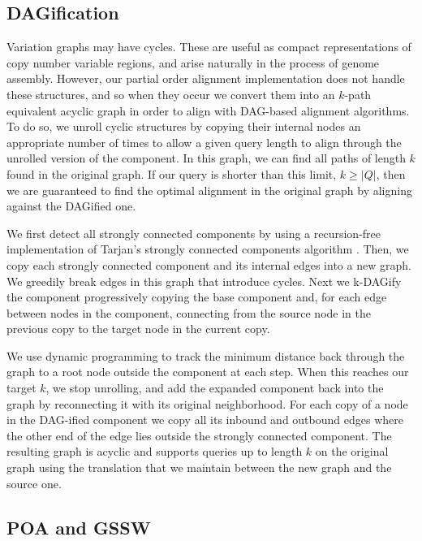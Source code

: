 \subsection{DAGification}
\label{sec:DAGify}

Variation graphs may have cycles.
These are useful as compact representations of copy number variable regions, and arise naturally in the process of genome assembly.
However, our partial order alignment implementation does not handle these structures, and so when they occur we convert them into an $k$-path equivalent acyclic graph in order to align with DAG-based alignment algorithms.
To do so, we unroll cyclic structures by copying their internal nodes an appropriate number of times to allow a given query length to align through the unrolled version of the component.
In this graph, we can find all paths of length $k$ found in the original graph.
If our query is shorter than this limit, $k \geq |Q|$, then we are guaranteed to find the optimal alignment in the original graph by aligning against the DAGified one.

We first detect all strongly connected components by using a recursion-free implementation of Tarjan's strongly connected components algorithm \cite{tarjan1972depth}.
Then, we copy each strongly connected component and its internal edges into a new graph.
We greedily break edges in this graph that introduce cycles.
Next we k-DAGify the component progressively copying the base component and, for each edge between nodes in the component, connecting from the source node in the previous copy to the target node in the current copy.

We use dynamic programming to track the minimum distance back through the graph to a root node outside the component at each step.
When this reaches our target $k$, we stop unrolling, and add the expanded component back into the graph by reconnecting it with its original neighborhood.
For each copy of a node in the DAG-ified component we copy all its inbound and outbound edges where the other end of the edge lies outside the strongly connected component.
The resulting graph is acyclic and supports queries up to length $k$ on the original graph using the translation that we maintain between the new graph and the source one.


\subsection{POA and GSSW}

